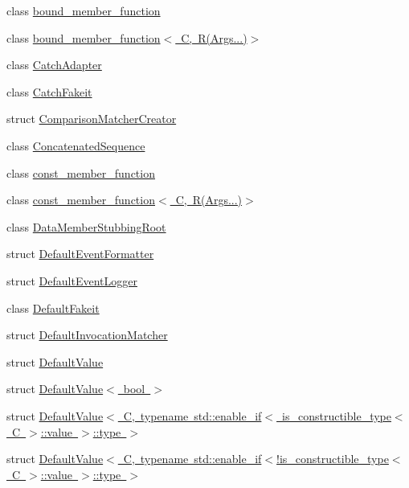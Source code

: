 \begin{DoxyCompactItemize}
\item 
class \mbox{\hyperlink{classfakeit_1_1bound__member__function}{bound\+\_\+member\+\_\+function}}
\item 
class \mbox{\hyperlink{classfakeit_1_1bound__member__function_3_01C_00_01R_07Args_8_8_8_08_4}{bound\+\_\+member\+\_\+function$<$ C, R(\+Args...)$>$}}
\item 
class \mbox{\hyperlink{classfakeit_1_1CatchAdapter}{Catch\+Adapter}}
\item 
class \mbox{\hyperlink{classfakeit_1_1CatchFakeit}{Catch\+Fakeit}}
\item 
struct \mbox{\hyperlink{structfakeit_1_1ComparisonMatcherCreator}{Comparison\+Matcher\+Creator}}
\item 
class \mbox{\hyperlink{classfakeit_1_1ConcatenatedSequence}{Concatenated\+Sequence}}
\item 
class \mbox{\hyperlink{classfakeit_1_1const__member__function}{const\+\_\+member\+\_\+function}}
\item 
class \mbox{\hyperlink{classfakeit_1_1const__member__function_3_01C_00_01R_07Args_8_8_8_08_4}{const\+\_\+member\+\_\+function$<$ C, R(\+Args...)$>$}}
\item 
class \mbox{\hyperlink{classfakeit_1_1DataMemberStubbingRoot}{Data\+Member\+Stubbing\+Root}}
\item 
struct \mbox{\hyperlink{structfakeit_1_1DefaultEventFormatter}{Default\+Event\+Formatter}}
\item 
struct \mbox{\hyperlink{structfakeit_1_1DefaultEventLogger}{Default\+Event\+Logger}}
\item 
class \mbox{\hyperlink{classfakeit_1_1DefaultFakeit}{Default\+Fakeit}}
\item 
struct \mbox{\hyperlink{structfakeit_1_1DefaultInvocationMatcher}{Default\+Invocation\+Matcher}}
\item 
struct \mbox{\hyperlink{structfakeit_1_1DefaultValue}{Default\+Value}}
\item 
struct \mbox{\hyperlink{structfakeit_1_1DefaultValue_3_01bool_01_4}{Default\+Value$<$ bool $>$}}
\item 
struct \mbox{\hyperlink{structfakeit_1_1DefaultValue_3_01C_00_01typename_01std_1_1enable__if_3_01is__constructible__typeba4172eb6f54b4f010948e5b77fe8b8f}{Default\+Value$<$ C, typename std\+::enable\+\_\+if$<$ is\+\_\+constructible\+\_\+type$<$ C $>$\+::value $>$\+::type $>$}}
\item 
struct \mbox{\hyperlink{structfakeit_1_1DefaultValue_3_01C_00_01typename_01std_1_1enable__if_3_9is__constructible__type_237d75e2cfb810085e1504a1340d5949}{Default\+Value$<$ C, typename std\+::enable\+\_\+if$<$!is\+\_\+constructible\+\_\+type$<$ C $>$\+::value $>$\+::type $>$}}

\end{DoxyCompactItemize}
